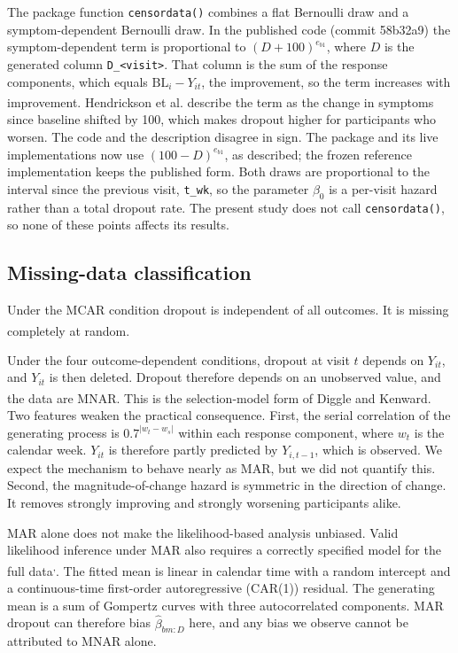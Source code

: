\documentclass[
  11pt,
]{article}
\newcounter{none} %
\begin{document}
The package function \texttt{censordata()} combines a flat Bernoulli draw and
a symptom-dependent Bernoulli draw. In the published code (commit
58b32a9) the symptom-dependent term is proportional to
\((D + 100)^{e_{b1}}\), where \(D\) is the generated column \texttt{D\_\textless{}visit\textgreater{}}.
That column is the sum of the response components, which equals
\(\mathrm{BL}_i - Y_{it}\), the improvement, so the term increases with
improvement. Hendrickson et al.\textsuperscript{} describe the term as the change in
symptoms since baseline shifted by 100, which makes dropout higher
for participants who worsen. The code and the description disagree in
sign. The package and its live implementations now use
\((100 - D)^{e_{b1}}\), as described; the frozen reference
implementation keeps the published form. Both draws are proportional
to the interval since the previous visit, \texttt{t\_wk}, so the parameter
\(\beta_0\) is a per-visit hazard rather than a total dropout rate. The
present study does not call \texttt{censordata()}, so none of these points
affects its results.

\subsection{Missing-data classification}\label{sec-mar}

Under the MCAR condition dropout is independent of all outcomes. It is
missing completely at random\textsuperscript{}.

Under the four outcome-dependent conditions, dropout at visit \(t\)
depends on \(Y_{it}\), and \(Y_{it}\) is then deleted. Dropout therefore
depends on an unobserved value, and the data are MNAR. This is the
selection-model form of Diggle and Kenward\textsuperscript{}. Two features weaken the practical
consequence. First, the serial correlation of the generating process
is \(0.7^{|w_t - w_s|}\) within each response component, where \(w_t\) is
the calendar week. \(Y_{it}\) is therefore partly predicted by
\(Y_{i,t-1}\), which is observed. We expect the mechanism to behave
nearly as MAR, but we did not quantify this. Second, the
magnitude-of-change hazard is symmetric in the direction of change. It
removes strongly improving and strongly worsening participants alike.

MAR alone does not make the likelihood-based analysis unbiased. Valid
likelihood inference under MAR also requires a correctly specified
model for the full data\textsuperscript{,}.
The fitted mean is linear in calendar time with a random intercept and
a continuous-time first-order autoregressive (CAR(1)) residual. The
generating mean is a sum of Gompertz curves with three
autocorrelated components. MAR dropout can therefore bias
\(\hat\beta_{bm:D}\) here, and any bias we observe cannot be attributed
to MNAR alone.
\end{document}
